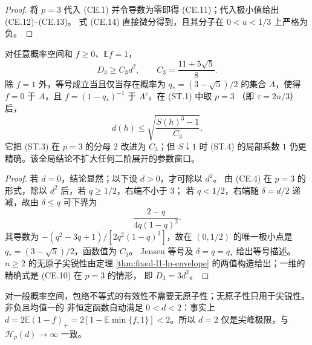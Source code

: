 \begin{proof}
将 $p=3$ 代入 (CE.1) 并令导数为零即得 (CE.11)；代入极小值给出 (CE.12)--(CE.13)。
式 (CE.14) 直接微分得到，且其分子在 $0<u<1/3$ 上严格为负。
\end{proof}

\begin{corollary}[三次矩的全局二次常数]
\label{prop:global-l1-cubic}
对任意概率空间和 $f\ge0$、$\mathbb Ef=1$，
\[
 D_3\ge C_3d^2,\qquad C_3=\frac{11+5\sqrt5}{8}. \tag{CE.15}
\]
除 $f=1$ 外，等号成立当且仅当存在概率为
$q_*=(3-\sqrt5)/2$ 的集合 $A$，使得$f=0$ 于 $A$，且
$f=(1-q_*)^{-1}$ 于 $A^c$。在 \textup{(ST.1)} 中取 $p=3$
（即 $\tau=2n/3$）后，
\[
 d(h)\le\sqrt{\frac{S(h)^3-1}{C_3}}. \tag{CE.16}
\]
它把 \textup{(ST.3)} 在 $p=3$ 的分母 $2$ 改进为 $C_3$；但 $S\downarrow1$ 时
\textup{(ST.4)} 的局部系数 $1$ 仍更精确。该全局结论不扩大任何二阶展开的参数窗口。
\end{corollary}

\begin{proof}
若 $d=0$，结论显然；以下设 $d>0$，才可除以 $d^2$。
由 (CE.4) 在 $p=3$ 的形式，除以 $d^2$ 后，若 $q\ge1/2$，右端不小于 $3$；
若 $q<1/2$，右端随 $\delta=d/2$ 递减，故由 $\delta\le q$ 可下界为
\[
 \frac{2-q}{4q(1-q)^2}.
\]
其导数为 $-(q^2-3q+1)/[2q^2(1-q)^3]$，故在 $(0,1/2)$ 的唯一极小点是 $q_*=(3-\sqrt5)/2$，函数值为 $C_3$。
Jensen 等号及 $\delta=q=q_*$ 给出等号描述。$n\ge2$ 的无原子尖锐性由定理
\ref{thm:fixed-l1-lp-envelope} 的两值构造给出；一维的精确式是 (CE.10) 在 $p=3$ 的情形，
即 $D_3=3d^2$。
\end{proof}

\begin{remark}
对一般概率空间，包络不等式的有效性不需要无原子性；无原子性只用于尖锐性。非负且均值一的
非恒定函数自动满足 $0<d<2$：事实上
\(d=2\mathbb E(1-f)_+=2[1-\mathbb E\min\{f,1\}]<2\)。所以 $d=2$ 仅是尖峰极限，与
$\mathcal H_p(d)\to\infty$ 一致。
\end{remark}
